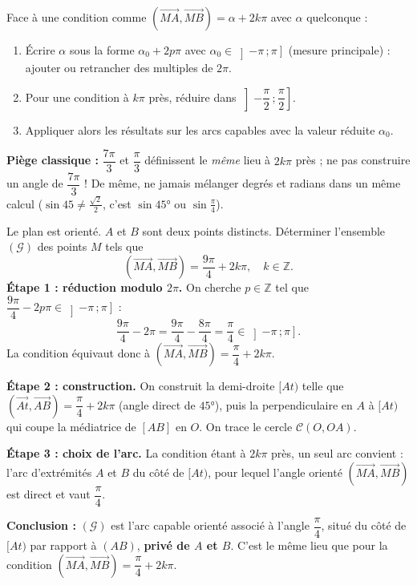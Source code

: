 \documentclass[11pt]{article}
\begin{document}
\begin{methode}
Face à une condition comme $(\overrightarrow{MA},\overrightarrow{MB})=\alpha+2k\pi$ avec $\alpha$ quelconque :
\begin{enumerate}
\item Écrire $\alpha$ sous la forme $\alpha_0+2p\pi$ avec $\alpha_0\in\left]-\pi\,;\pi\right]$ (mesure principale) : ajouter ou retrancher des multiples de $2\pi$.
\item Pour une condition à $k\pi$ près, réduire dans $\left]-\dfrac{\pi}{2}\,;\dfrac{\pi}{2}\right]$.
\item Appliquer alors les résultats sur les arcs capables avec la valeur réduite $\alpha_0$.
\end{enumerate}
\textbf{Piège classique :} $\dfrac{7\pi}{3}$ et $\dfrac{\pi}{3}$ définissent le \emph{même} lieu à $2k\pi$ près ; ne pas construire un angle de $\dfrac{7\pi}{3}$ ! De même, ne jamais mélanger degrés et radians dans un même calcul ($\sin 45 \neq \frac{\sqrt2}{2}$, c'est $\sin 45°$ ou $\sin\frac{\pi}{4}$).
\end{methode}

\begin{exoresolu}
Le plan est orienté. $A$ et $B$ sont deux points distincts. Déterminer l'ensemble $(\mathcal{G})$ des points $M$ tels que
\[
(\overrightarrow{MA},\overrightarrow{MB})=\frac{9\pi}{4}+2k\pi,\quad k\in\mathbb{Z}.
\]
\tcblower
\textbf{Étape 1 : réduction modulo $2\pi$.} On cherche $p\in\mathbb{Z}$ tel que $\dfrac{9\pi}{4}-2p\pi\in\left]-\pi\,;\pi\right]$ :
\[
\frac{9\pi}{4}-2\pi=\frac{9\pi}{4}-\frac{8\pi}{4}=\frac{\pi}{4}\in\left]-\pi\,;\pi\right].
\]
La condition équivaut donc à $(\overrightarrow{MA},\overrightarrow{MB})=\dfrac{\pi}{4}+2k\pi$.

\textbf{Étape 2 : construction.} On construit la demi-droite $[At)$ telle que $(\overrightarrow{At},\overrightarrow{AB})=\dfrac{\pi}{4}+2k\pi$ (angle direct de $45°$), puis la perpendiculaire en $A$ à $[At)$ qui coupe la médiatrice de $[AB]$ en $O$. On trace le cercle $\mathcal{C}(O,OA)$.

\textbf{Étape 3 : choix de l'arc.} La condition étant à $2k\pi$ près, un seul arc convient : l'arc d'extrémités $A$ et $B$ du côté de $[At)$, pour lequel l'angle orienté $(\overrightarrow{MA},\overrightarrow{MB})$ est direct et vaut $\dfrac{\pi}{4}$.

\textbf{Conclusion :} $(\mathcal{G})$ est l'arc capable orienté associé à l'angle $\dfrac{\pi}{4}$, situé du côté de $[At)$ par rapport à $(AB)$, \textbf{privé de $A$ et $B$}. C'est le même lieu que pour la condition $(\overrightarrow{MA},\overrightarrow{MB})=\dfrac{\pi}{4}+2k\pi$.
\end{exoresolu}
\end{document}
